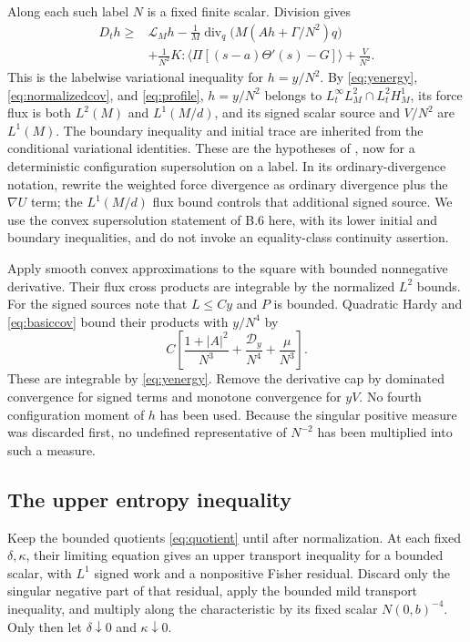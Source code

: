 \documentclass[11pt]{article}
\numberwithin{equation}{section}
\newcommand{\Div}{\operatorname{div}}
\newcommand{\grad}{\nabla}
\newcommand{\Dy}{\mathcal D_y}
\newcommand{\pair}[1]{\langle #1\rangle}
\begin{document}
Along each such label $N$ is a fixed finite scalar. Division gives
\begin{equation}\label{eq:hnormalized}
\begin{aligned}
 D_th\geq{}&\mathcal L_Mh
 -\frac1M\Div_q\bigl(M(Ah+\Gamma/N^2)q\bigr)\\
 &+\frac1{N^2}K:\pair{\Pi[(s-a)\Theta'(s)-G]}+\frac V{N^2}.
\end{aligned}
\end{equation}
This is the labelwise variational inequality for $h=y/N^2$.
By \eqref{eq:yenergy}, \eqref{eq:normalizedcov}, and
\eqref{eq:profile}, $h=y/N^2$ belongs to
$L^\infty_tL^2_M\cap L^2_tH^1_M$, its force flux is both $L^2(M)$ and
$L^1(M/d)$, and its signed scalar source and $V/N^2$ are $L^1(M)$.
The boundary inequality and initial trace are inherited from the conditional
variational identities. These are the hypotheses of
\cite[Proposition~B.6]{Masmoudi}, now for a deterministic configuration
supersolution on a label. In its ordinary-divergence notation, rewrite the
weighted force divergence as ordinary divergence plus the $\grad U$ term;
the $L^1(M/d)$ flux bound controls that additional signed source. We use the
convex supersolution statement of B.6 here, with its lower initial and boundary
inequalities, and do not invoke an equality-class continuity assertion.

Apply smooth convex approximations to the square with bounded nonnegative
derivative. Their flux cross products are integrable by the normalized
$L^2$ bounds. For the signed sources note that $L\leq Cy$ and $P$ is bounded.
Quadratic Hardy and \eqref{eq:basiccov} bound their products with $y/N^4$ by
\begin{equation}\label{eq:squareproducts}
 C\left[\frac{1+|A|^2}{N^3}+\frac{\Dy}{N^4}+\frac\mu{N^3}\right].
\end{equation}
These are integrable by \eqref{eq:yenergy}. Remove the derivative cap by
dominated convergence for signed terms and monotone convergence for $yV$.
No fourth configuration moment of $h$ has been used. Because the singular
positive measure was discarded first, no undefined representative of $N^{-2}$
has been multiplied into such a measure.

\subsection{The upper entropy inequality}\label{subsec:upper}
Keep the bounded quotients \eqref{eq:quotient} until after normalization.
At each fixed $\delta,\kappa$, their limiting equation gives an upper
transport inequality for a bounded scalar, with $L^1$ signed work and a
nonpositive Fisher residual. Discard only the singular negative part of that
residual, apply the bounded mild transport inequality, and multiply along the
characteristic by its fixed scalar $N(0,b)^{-4}$. Only then let
$\delta\downarrow0$ and $\kappa\downarrow0$.
\end{document}
